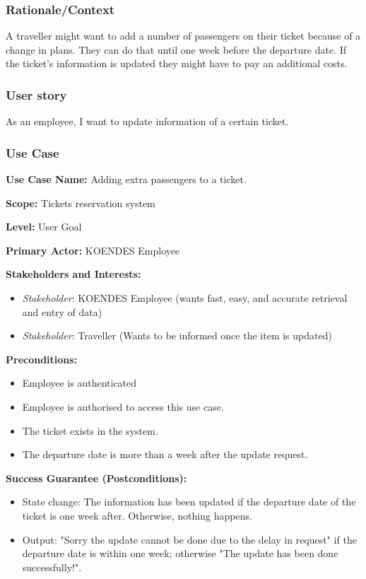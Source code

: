 \subsubsection{Rationale/Context}
A traveller might want to add a number of passengers on their ticket because of a change in plans. They can do that until one week before the departure date. If the ticket's information is updated they might have to pay an additional costs.
\subsubsection{User story}
As an employee, I want to update information of a certain ticket.
\subsubsection{Use Case}
\creator{\studentB}
\updater{\studentC}
\secondUpdater{\studentA}

\textbf{Use Case Name:} Adding extra passengers to a ticket.

\textbf{Scope:} Tickets reservation system

\textbf{Level:} User Goal

\textbf{Primary Actor:} KOENDES Employee

\textbf{Stakeholders and Interests:} 
\begin{itemize}
\item \textit{Stakeholder}: KOENDES Employee (wants fast, easy, and accurate retrieval and entry of data)
\item \textit{Stakeholder}: Traveller (Wants to be informed once the item is updated)
\end{itemize}
\textbf{Preconditions:} 
\begin{itemize}
\item Employee is authenticated
\item Employee is authorised to access this use case.
\item The ticket exists in the system.
\item The departure date is more than a week after the update request.
\end{itemize}

\textbf{Success Guarantee (Postconditions):} 
\begin{itemize}
\item State change: The information has been updated if the departure date of the ticket is one week after. Otherwise, nothing happens. 
\item Output: "Sorry the update cannot be done due to the delay in request" if the departure date is within one week; otherwise "The update has been done successfully!".
\end{itemize}

